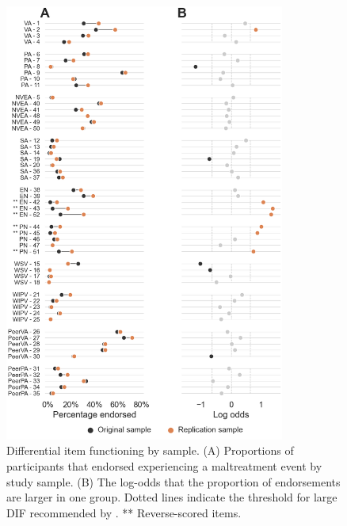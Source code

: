\documentclass[letterpaper,man,natbib,longtable,floatsintext,12pt]{apa6}
\begin{document}
\pagebreak

\begin{figure}[H]
    \centering
    \includegraphics[width=0.82\textwidth,center]{figures/figS01.png}
    \caption{\normalfont Differential item functioning by sample. (A) Proportions of participants that endorsed experiencing a maltreatment event by study sample. (B) The log-odds that the proportion of endorsements are larger in one group. Dotted lines indicate the threshold for large DIF recommended by \cite{hidalgo2014binary}. ** Reverse-scored items.}
    \label{fig:dif_study}
\end{figure}

\pagebreak
\end{document}
